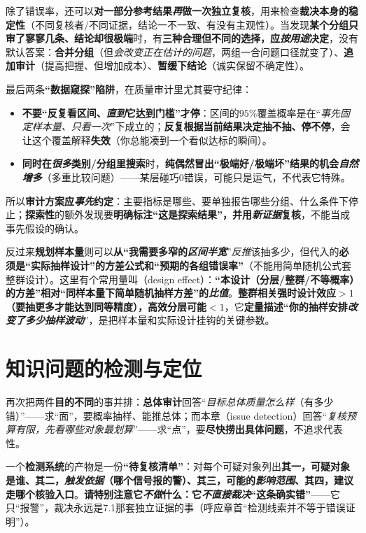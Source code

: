 除了错误率，还可以\textbf{对一部分参考结果\emph{再}做一次独立复核}，用来检查\textbf{裁决本身的稳定性}（不同复核者/不同证据，结论一不一致、有没有主观性）。当发现\textbf{某个分组只审了寥寥几条、结论却很极端}时，有\textbf{三种合理但不同的选择，应\emph{按用途}决定}，没有默认答案：\textbf{合并分组}（但\emph{会改变正在估计的问题}，两组一合问题口径就变了）、\textbf{追加审计}（提高把握、但增加成本）、\textbf{暂缓下结论}（诚实保留不确定性）。

最后两条\textbf{“数据窥探”陷阱}，在质量审计里尤其要守纪律：
\begin{itemize}\item \textbf{不要“反复看区间、\emph{直到}它达到门槛”才停}：区间的$95\%$覆盖概率是在“\emph{事先固定样本量、只看一次}”下成立的；\textbf{反复根据当前结果决定抽不抽、停不停}，会让这个覆盖解释\textbf{失效}（你总能凑到一个看似达标的瞬间）。\item \textbf{同时在\emph{很多}类别/分组里搜索}时，\textbf{纯偶然冒出“极端好/极端坏”结果的机会\emph{自然增多}}（多重比较问题）——某层碰巧$0$错误，可能只是运气，不代表它特殊。\end{itemize}
所以\textbf{审计方案应\emph{事先}约定}：主要指标是哪些、要单独报告哪些分组、什么条件下停止；\textbf{探索性}的额外发现要\textbf{明确标注“这是探索结果”，并用\emph{新证据}复核}，不能当成事先假设的确认。

反过来\textbf{规划样本量}则可以\textbf{从“我需要多窄的\emph{区间半宽}}”\emph{反推}该抽多少，但代入的\textbf{必须是“实际抽样设计”的方差公式和“预期的各组错误率”}（不能用简单随机公式套整群设计）。这里有个常用量叫（design effect）：\textbf{“本设计（分层/整群/不等概率）的方差”相对“同样本量下简单随机抽样方差”的\emph{比值}}。\textbf{整群相关强时设计效应$>1$（要抽更多才能达到同等精度），高效分层可能$<1$}，它\textbf{定量描述“你的抽样安排\emph{改变了多少抽样波动}}”，是把样本量和实际设计挂钩的关键参数。

\section{知识问题的检测与定位}
\label{sec:knowledge-quality-assessment-correction-detection}

再次把两件\textbf{目的不同}的事并排：\textbf{总体审计}回答“\emph{目标总体质量\emph{怎么样}}（有多少错）”——求“面”，要概率抽样、能推总体；而本章（issue detection）回答“\emph{复核预算有限，\emph{先看哪些对象}最划算}”——求“点”，要\textbf{尽快捞出具体问题}，不追求代表性。

一个\textbf{检测系统}的产物是一份\textbf{“待复核清单”}：对每个可疑对象列出\textbf{其一，可疑对象是谁、其二，\emph{触发依据}（哪个信号报的警）、其三，可能的\emph{影响范围}、其四，建议走哪个核验入口}。\textbf{请特别注意它\emph{不做}什么：它\emph{不直接裁决}“这条确实错”}——它只“报警”，裁决永远是7.1那套独立证据的事（呼应章首“检测线索并不等于错误证明”）。

